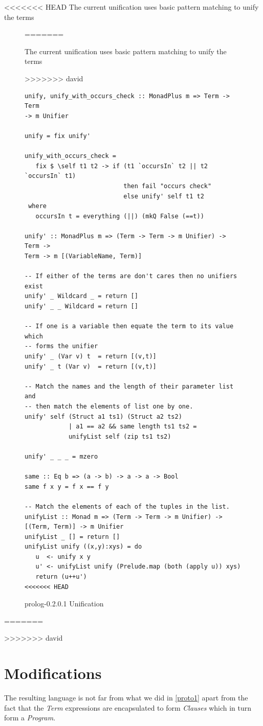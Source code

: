 \documentclass[thesis-solanki.tex]{subfiles}
\begin{document}
<<<<<<< HEAD
The current unification uses basic pattern matching to unify the terms 
\begin{figure}[h]
=======


The current unification uses basic pattern matching to unify the terms


>>>>>>> david
\begin{verbatim}
unify, unify_with_occurs_check :: MonadPlus m => Term -> Term
-> m Unifier

unify = fix unify'

unify_with_occurs_check =
   fix $ \self t1 t2 -> if (t1 `occursIn` t2 || t2 `occursIn` t1)
                           then fail "occurs check"
                           else unify' self t1 t2
 where
   occursIn t = everything (||) (mkQ False (==t))

unify' :: MonadPlus m => (Term -> Term -> m Unifier) -> Term ->
Term -> m [(VariableName, Term)]

-- If either of the terms are don't cares then no unifiers exist
unify' _ Wildcard _ = return []
unify' _ _ Wildcard = return []

-- If one is a variable then equate the term to its value which
-- forms the unifier
unify' _ (Var v) t  = return [(v,t)]
unify' _ t (Var v)  = return [(v,t)]

-- Match the names and the length of their parameter list and
-- then match the elements of list one by one.
unify' self (Struct a1 ts1) (Struct a2 ts2)
            | a1 == a2 && same length ts1 ts2 =
            unifyList self (zip ts1 ts2)

unify' _ _ _ = mzero

same :: Eq b => (a -> b) -> a -> a -> Bool
same f x y = f x == f y

-- Match the elements of each of the tuples in the list.
unifyList :: Monad m => (Term -> Term -> m Unifier) ->
[(Term, Term)] -> m Unifier
unifyList _ [] = return []
unifyList unify ((x,y):xys) = do
   u  <- unify x y
   u' <- unifyList unify (Prelude.map (both (apply u)) xys)
   return (u++u')
<<<<<<< HEAD
\end{verbatim} 
\caption{prolog-0.2.0.1 Unification}
\label{tab:prlg0201unif}
\end{figure}
=======

>>>>>>> david

\clearpage
\section{Modifications}
The resulting language is not far from what we did in \ref{proto1} apart from the fact that the \textit{Term} expressions are encapsulated
to form \textit{Clauses} which in turn form a \textit{Program}.
\end{document}
